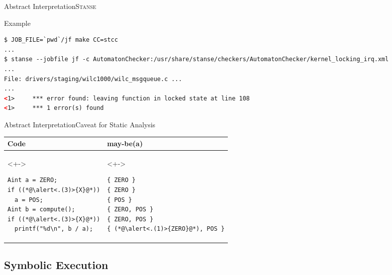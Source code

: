 \begin{frame}[fragile]{Abstract Interpretation}{\textsc{Stanse}}

  \begin{block}{Example}
  \begin{lstlisting}[language=XML]
$ JOB_FILE=`pwd`/jf make CC=stcc
...
$ stanse --jobfile jf -c AutomatonChecker:/usr/share/stanse/checkers/AutomatonChecker/kernel_locking_irq.xml
...
File: drivers/staging/wilc1000/wilc_msgqueue.c ...
...
<1>     *** error found: leaving function in locked state at line 108
<1>     *** 1 error(s) found
  \end{lstlisting} %
  \end{block}

\end{frame}

\begin{frame}[fragile]{Abstract Interpretation}{Caveat for Static Analysis}

  \begin{center}
  \begin{tabular}{|l|l|} \hline
  Code & may-be(a) \\ \hline
  \begin{uncoverenv}<+->
  \begin{lstlisting}
Aint a = ZERO;
if ((*@\alert<.(3)>{X}@*))
  a = POS;
Aint b = compute();
if ((*@\alert<.(3)>{X}@*))
  printf("%d\n", b / a);
  \end{lstlisting} %
  \end{uncoverenv}
  &
  \begin{uncoverenv}<+->
  \begin{lstlisting}
{ ZERO }
{ ZERO }
{ POS }
{ ZERO, POS }
{ ZERO, POS }
{ (*@\alert<.(1)>{ZERO}@*), POS }
  \end{lstlisting}
  \end{uncoverenv}
  \\ \hline
  \end{tabular}

  \addtocounter{beamerpauses}{-1}
  \pause
  \bigskip


  \pause
  \medskip

  \end{center}

\end{frame}

\subsection{Symbolic Execution}


